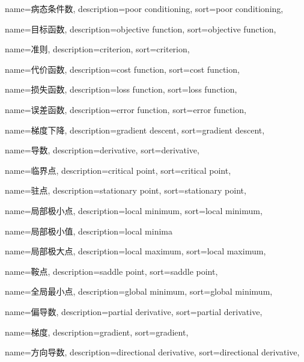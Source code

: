 {
  name=病态条件数,
  description={poor conditioning},
  sort={poor conditioning},
}

{
  name=目标函数,
  description={objective function},
  sort={objective function},
}

{
  name=准则,
  description={criterion},
  sort={criterion},
}

{
  name=代价函数,
  description={cost function},
  sort={cost function},
}

{
  name=损失函数,
  description={loss function},
  sort={loss function},
}

{
  name=误差函数,
  description={error function},
  sort={error function},
}

{
  name=梯度下降,
  description={gradient descent},
  sort={gradient descent},
}

{
  name=导数,
  description={derivative},
  sort={derivative},
}

{
  name=临界点,
  description={critical point},
  sort={critical point},
}

{
  name=驻点,
  description={stationary point},
  sort={stationary point},
}

{
  name=局部极小点,
  description={local minimum},
  sort={local minimum},
}

{
  name=局部极小值,
  description={local minima}
}

{
  name=局部极大点,
  description={local maximum},
  sort={local maximum},
}

{
  name=鞍点,
  description={saddle point},
  sort={saddle point},
}

{
  name=全局最小点,
  description={global minimum},
  sort={global minimum},
}

{
  name=偏导数,
  description={partial derivative},
  sort={partial derivative},
}

{
  name=梯度,
  description={gradient},
  sort={gradient},
}

{
  name=方向导数,
  description={directional derivative},
  sort={directional derivative},
}


